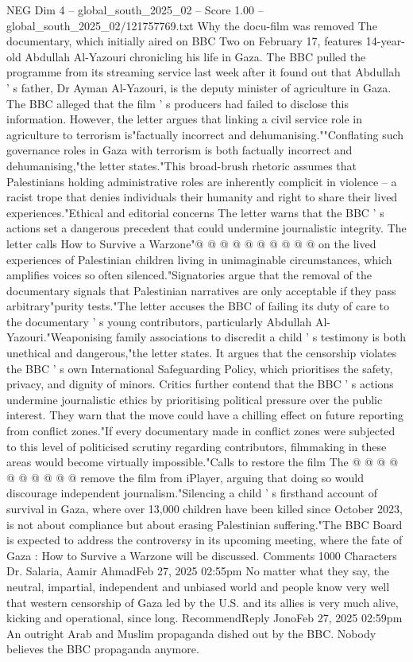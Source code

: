 \begin{textsample}{NEG Dim 4 – global\_south\_2025\_02 – Score 1.00 – global\_south\_2025\_02/121757769.txt}  \label{ex:f4_neg_432}
Why the docu-film was removed The documentary, which initially aired on BBC Two on February 17, features 14-year-old Abdullah Al-Yazouri chronicling his life in Gaza.
The BBC pulled the programme from its streaming service last week after it found out that Abdullah ' s father, Dr Ayman Al-Yazouri, is the deputy minister of agriculture in Gaza.
The BBC alleged that the film ' s producers had failed to disclose this information.
However, the letter argues that linking a civil service role in agriculture to terrorism is"factually incorrect and dehumanising.""Conflating such governance roles in Gaza with terrorism is both factually incorrect and dehumanising,"the letter states."This broad-brush rhetoric assumes that Palestinians holding administrative roles are inherently complicit in violence -- a racist trope that denies individuals their humanity and right to share their lived experiences."Ethical and editorial concerns The letter warns that the BBC ' s actions set a dangerous precedent that could undermine journalistic integrity.
The letter calls How to Survive a Warzone"@ @ @ @ @ @ @ @ @ @ on the lived experiences of Palestinian children living in unimaginable circumstances, which amplifies voices so often silenced."Signatories argue that the removal of the documentary signals that Palestinian narratives are only acceptable if they pass arbitrary"purity tests."The letter accuses the BBC of failing its duty of care to the documentary ' s young contributors, particularly Abdullah Al-Yazouri."Weaponising family associations to discredit a child ' s testimony is both unethical and dangerous,"the letter states.
It argues that the censorship violates the BBC ' s own International Safeguarding Policy, which prioritises the safety, privacy, and dignity of minors.
Critics further contend that the BBC ' s actions undermine journalistic ethics by prioritising political pressure over the public interest.
They warn that the move could have a chilling effect on future reporting from conflict zones."If every documentary made in conflict zones were subjected to this level of politicised scrutiny regarding contributors, filmmaking in these areas would become virtually impossible."Calls to restore the film The @ @ @ @ @ @ @ @ @ @ remove the film from iPlayer, arguing that doing so would discourage independent journalism."Silencing a child ' s firsthand account of survival in Gaza, where over 13,000 children have been killed since October 2023, is not about compliance but about erasing Palestinian suffering."The BBC Board is expected to address the controversy in its upcoming meeting, where the fate of Gaza : How to Survive a Warzone will be discussed.
Comments 1000 Characters Dr.
Salaria, Aamir AhmadFeb 27, 2025 02:55pm No matter what they say, the neutral, impartial, independent and unbiased world and people know very well that western censorship of Gaza led by the U.S. and its allies is very much alive, kicking and operational, since long.
RecommendReply JonoFeb 27, 2025 02:59pm An outright Arab and Muslim propaganda dished out by the BBC.
Nobody believes the BBC propaganda anymore.

\end{textsample}
